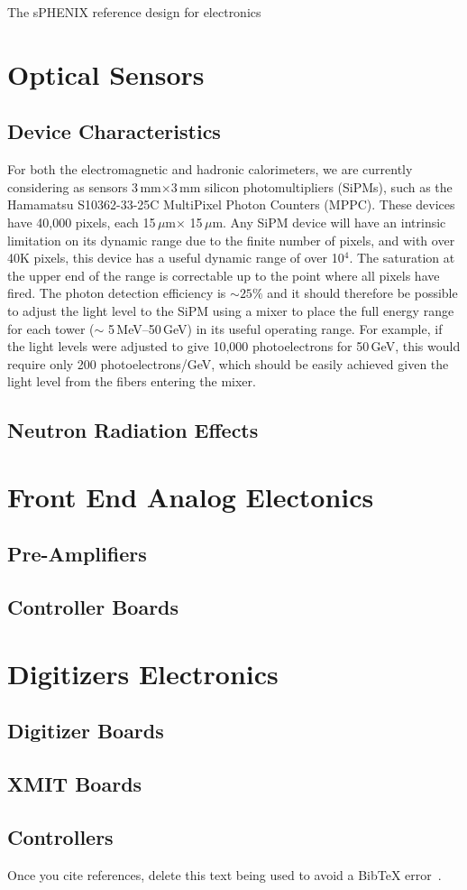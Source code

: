 The sPHENIX reference design for electronics 

\section{Optical Sensors}


\subsection{Device Characteristics}
For both the electromagnetic and hadronic calorimeters, we are
currently considering as sensors 3\,mm$\times$3\,mm silicon photomultipliers
(SiPMs), such as the Hamamatsu S10362-33-25C MultiPixel Photon
Counters (MPPC).  These devices have 40,000 pixels, each
15\,$\mu$m$\times$ 15\,$\mu$m. Any SiPM device will have an intrinsic
limitation on its dynamic range due to the finite number of pixels,
and with over 40K pixels, this device has a useful dynamic range of
over 10$^4$.  The saturation at the upper end of the range is
correctable up to the point where all pixels have fired.  The photon
detection efficiency is $\sim25\%$ and it should therefore be possible
to adjust the light level to the SiPM using a mixer to place the full
energy range for each tower ($\sim$ 5\,MeV--50\,GeV) in its useful
operating range. For example, if the light levels were adjusted to
give 10,000 photoelectrons for 50\,GeV, this would require only 200 photoelectrons/GeV,
which should be easily achieved given the light level from
the fibers entering the mixer.

\subsection{Neutron Radiation Effects}

\section{Front End Analog Electonics}
\subsection{Pre-Amplifiers}
\subsection{Controller Boards}
\section{Digitizers Electronics}
\subsection{Digitizer Boards}
\subsection{XMIT Boards}
\subsection{Controllers}

 
Once you cite references, delete this text being used
to avoid a BibTeX error~\cite{Adare:2010ux}.